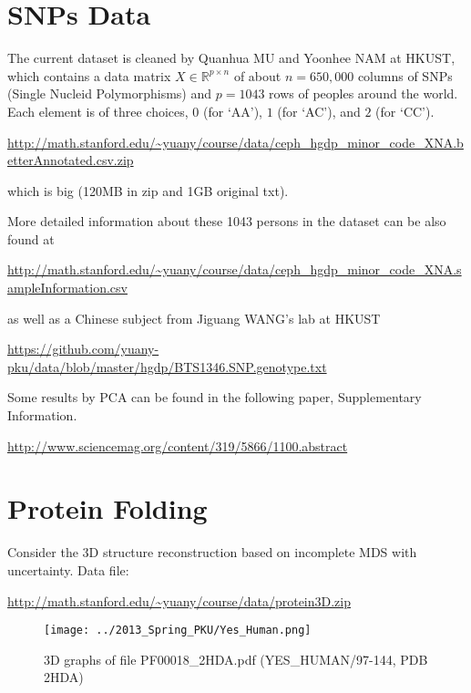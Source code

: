 \documentclass[11pt]{article}
\def\R{{\mathbb R}}
\begin{document}
\section{SNPs Data}
The current dataset is cleaned by Quanhua MU and Yoonhee NAM at HKUST, which contains a data matrix $X\in \R^{p\times n}$ of about $n=650,000$ columns of SNPs (Single Nucleid Polymorphisms) and $p=1043$ rows of peoples around the world. Each element is of three choices, $0$ (for `AA'), $1$ (for `AC'), and $2$ (for `CC'). 

\url{http://math.stanford.edu/~yuany/course/data/ceph_hgdp_minor_code_XNA.betterAnnotated.csv.zip}

\noindent which is big (120MB in zip and 1GB original txt). 

\noindent More detailed information about these 1043 persons in the dataset can be also found at

\url{http://math.stanford.edu/~yuany/course/data/ceph_hgdp_minor_code_XNA.sampleInformation.csv}

\noindent as well as a Chinese subject from Jiguang WANG's lab at HKUST

\url{https://github.com/yuany-pku/data/blob/master/hgdp/BTS1346.SNP.genotype.txt}

Some results by PCA can be found in the following paper, Supplementary Information. 

\url{http://www.sciencemag.org/content/319/5866/1100.abstract}

\section{Protein Folding} 
Consider the 3D structure reconstruction based on incomplete MDS with uncertainty. Data file: 

\url{http://math.stanford.edu/~yuany/course/data/protein3D.zip}

\begin{figure}[htbp]
\begin{center}
\texttt{[image: ../2013\_Spring\_PKU/Yes\_Human.png]}  
\caption{3D graphs of file PF00018\_2HDA.pdf (YES\_HUMAN/97-144, PDB 2HDA)}
\label{yes_human}
\end{center}
\end{figure}
\end{document}
